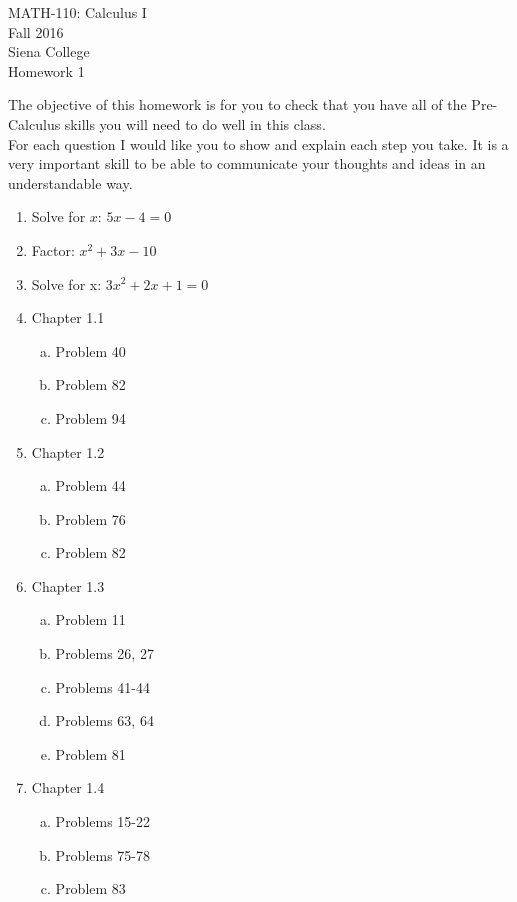 \documentclass[11pt]{article}
\begin{document}
	\begin{center}
		MATH-110: Calculus I\\
		Fall 2016\\
		Siena College\\
		\vspace{.1in}
		Homework 1
	\end{center}
	
	The objective of this homework is for you to check that you have all of the Pre-Calculus skills you will need to do well in this class.\\
	
	For each question I would like you to show and explain each step you take.  It is a very important skill to be able to communicate your thoughts and ideas in an understandable way. 
	
	\begin{enumerate}
		\item Solve for $x$:  $5 x - 4 = 0$
		\item Factor:  $x^2+3 x-10$
		\item Solve for x:  $3 x^2 + 2x + 1 = 0$
		\item Chapter 1.1
		\begin{enumerate}[a)]
			\item Problem 40
			\item Problem 82
			\item Problem 94
		\end{enumerate}
		\item Chapter 1.2
		\begin{enumerate}[a)]
			\item Problem 44
			\item Problem 76
			\item Problem 82
		\end{enumerate}
		\item Chapter 1.3
		\begin{enumerate}[a)]
			\item Problem 11
			\item Problems 26, 27
			\item Problems 41-44
			\item Problems 63, 64
			\item Problem 81
		\end{enumerate}
		\item Chapter 1.4
		\begin{enumerate}[a)]
			\item Problems 15-22
			\item Problems 75-78
			\item Problem 83
		\end{enumerate}
	\end{enumerate}
	
\end{document}
